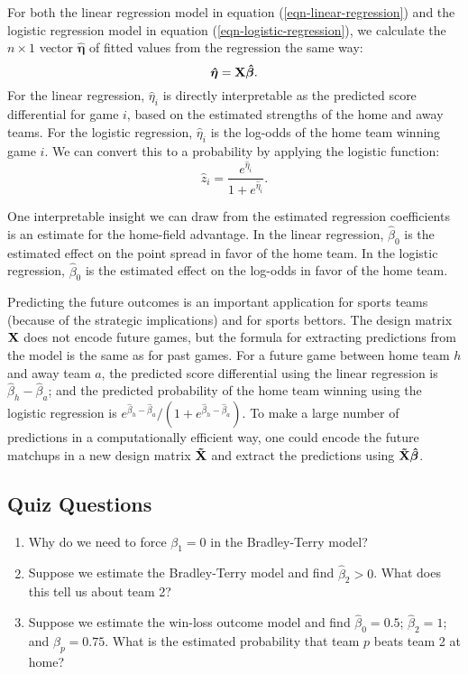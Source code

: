\documentclass{article}
\begin{document}
  For both the linear regression model in equation (\ref{eqn-linear-regression}) and the logistic regression model in equation (\ref{eqn-logistic-regression}), we calculate the $n \times 1$ vector $\boldsymbol{\hat\eta}$ of fitted values from the regression the same way:
  \begin{equation*}
    \boldsymbol{\hat\eta} = {\bf X} \boldsymbol{\hat\beta}.
  \end{equation*}
  For the linear regression, $\hat\eta_i$ is directly interpretable as the predicted score differential for game $i$, based on the estimated strengths of the home and away teams. For the logistic regression, $\hat\eta_i$ is the log-odds of the home team winning game $i$. We can convert this to a probability by applying the logistic function:
  \begin{equation*}
    \hat z_i = \frac{e^{\hat\eta_i}}{1 + e^{\hat\eta_i}}.
  \end{equation*}

  One interpretable insight we can draw from the estimated regression coefficients is an estimate for the home-field advantage. In the linear regression, $\hat\beta_0$ is the estimated effect on the point spread in favor of the home team. In the logistic regression, $\hat\beta_0$ is the estimated effect on the log-odds in favor of the home team.

  Predicting the future outcomes is an important application for sports teams (because of the strategic implications) and for sports bettors. The design matrix $\bf X$ does not encode future games, but the formula for extracting predictions from the model is the same as for past games. For a future game between home team $h$ and away team $a$, the predicted score differential using the linear regression is $\hat\beta_h - \hat\beta_a$; and the predicted probability of the home team winning using the logistic regression is $e^{\hat\beta_h - \hat\beta_a} / (1 + e^{\hat\beta_h - \hat\beta_a})$. To make a large number of predictions in a computationally efficient way, one could encode the future matchups in a new design matrix $\bf \tilde X$ and extract the predictions using $\bf \tilde X \boldsymbol{\hat\beta}$.

  \subsection{\sc Quiz Questions}

  \begin{enumerate}
    \item Why do we need to force $\beta_1 = 0$ in the Bradley-Terry model?
    \item Suppose we estimate the Bradley-Terry model and find $\hat\beta_2 > 0$. What does this tell us about team 2?
    \item Suppose we estimate the win-loss outcome model and find $\hat\beta_0 = 0.5$; $\hat\beta_2 = 1$; and $\hat\beta_p = 0.75$. What is the estimated probability that team $p$ beats team 2 at home?
  \end{enumerate}
\end{document}
